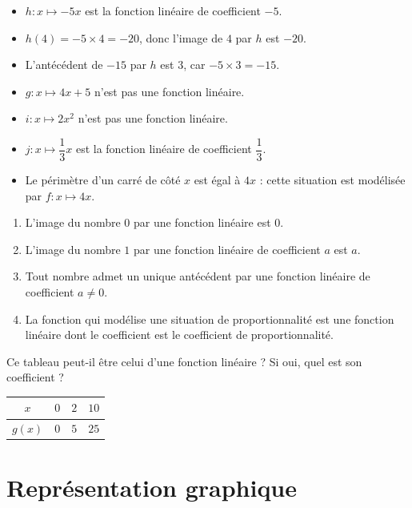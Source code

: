 \documentclass[a4paper,10pt]{report}
\begin{document}
\begin{ex}
\begin{itemize}
\item $h : x \mapsto -5x$ est la fonction linéaire de coefficient $-5$.
\item $h(4)=-5 \times 4=-20$, donc l'image de $4$ par $h$ est $-20$.
\item L'antécédent de $-15$ par $h$ est $3$, car $-5 \times 3=-15$.
\item $g : x \mapsto 4x+5$ n'est pas une fonction linéaire.
\item $i : x \mapsto 2x^2$ n'est pas une fonction linéaire.
\item $j : x \mapsto \dfrac{1}{3}x$ est la fonction linéaire de coefficient $\dfrac{1}{3}$.
\item Le périmètre d'un carré de côté $x$ est égal à $4x$ : cette situation est modélisée par $f : x \mapsto 4x$.
\end{itemize}
\end{ex}

\begin{prop}
\begin{enumerate}
\item L'image du nombre $0$ par une fonction linéaire est $0$.
\item L'image du nombre $1$ par une fonction linéaire de coefficient $a$ est $a$.
\item Tout nombre admet un unique antécédent par une fonction linéaire de coefficient $a \neq 0$.
\item La fonction qui modélise une situation de proportionnalité est une fonction linéaire dont le coefficient est le coefficient de proportionnalité.
\end{enumerate}
\end{prop}

\begin{ex}
Ce tableau peut-il être celui d'une fonction linéaire ? Si oui, quel est son coefficient ?
\begin{center}
\renewcommand{\arraystretch}{1.3}
\begin{tabular}{|c|c|c|c|}
\hline
$x$ & $0$ & $2$ & $10$\\
\hline
$g(x)$ & $0$ & $5$ & $25$\\
\hline
\end{tabular}
\end{center}
\end{ex}

\section{Représentation graphique}
\end{document}
